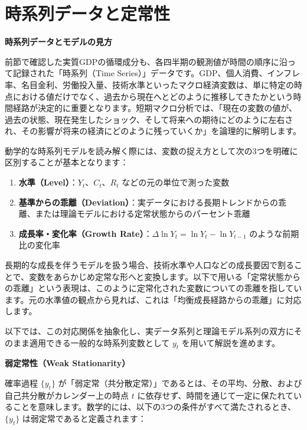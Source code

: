 \documentclass[
  japanese,
  lualatex,
  ja=standard,
  12pt,
  a4paper]{ltjsarticle}
\providecommand{\tightlist}{%
  \setlength{\itemsep}{0pt}\setlength{\parskip}{0pt}}
\begin{document}
\section{時系列データと定常性}\label{ux6642ux7cfbux5217ux30c7ux30fcux30bfux3068ux5b9aux5e38ux6027}

\textbf{時系列データとモデルの見方}

前節で確認した実質GDPの循環成分も、各四半期の観測値が時間の順序に沿って記録された「時系列（Time
Series）」データです。GDP、個人消費、インフレ率、名目金利、労働投入量、技術水準といったマクロ経済変数は、単に特定の時点における値だけでなく、過去から現在へとどのように推移してきたかという時間経路が決定的に重要となります。短期マクロ分析では、「現在の変数の値が、過去の状態、現在発生したショック、そして将来への期待にどのように左右され、その影響が将来の経済にどのように残っていくか」を論理的に解明します。

動学的な時系列モデルを読み解く際には、変数の捉え方として次の3つを明確に区別することが基本となります：

\begin{enumerate}
\def\labelenumi{\arabic{enumi}.}
\tightlist
\item
  \textbf{水準（Level）}：\(Y_t\)、\(C_t\)、\(R_t\)
  などの元の単位で測った変数
\item
  \textbf{基準からの乖離（Deviation）}：実データにおける長期トレンドからの乖離、または理論モデルにおける定常状態からのパーセント乖離
\item
  \textbf{成長率・変化率（Growth
  Rate）}：\(\Delta \ln Y_t = \ln Y_t - \ln Y_{t-1}\)
  のような前期比の変化率
\end{enumerate}

長期的な成長を伴うモデルを扱う場合、技術水準や人口などの成長要因で割ることで、変数をあらかじめ定常な形へと変換します。以下で用いる「定常状態からの乖離」という表現は、このように定常化された変数についての乖離を指しています。元の水準値の観点から見れば、これは「均衡成長経路からの乖離」に対応します。

以下では、この対応関係を抽象化し、実データ系列と理論モデル系列の双方にそのまま適用できる一般的な時系列変数として
\(y_t\) を用いて解説を進めます。

\textbf{弱定常性（Weak Stationarity）}

確率過程 \(\{y_t\}\)
が「弱定常（共分散定常）」であるとは、その平均、分散、および自己共分散がカレンダー上の時点
\(t\)
に依存せず、時間を通じて一定に保たれていることを意味します。数学的には、以下の3つの条件がすべて満たされるとき、\(\{y_t\}\)
は弱定常であると定義されます：
\end{document}
